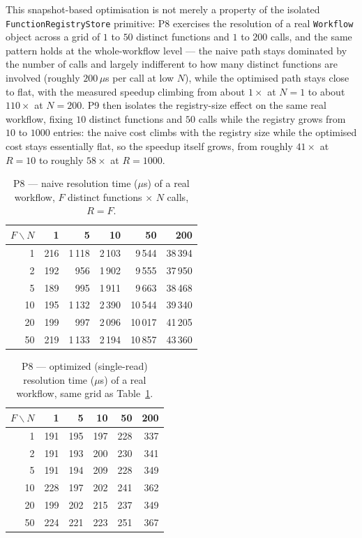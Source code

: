 This snapshot-based optimisation is not merely a property of the isolated
\texttt{FunctionRegistryStore} primitive: P8 exercises the resolution of a real \texttt{Workflow}
object across a grid of $1$ to $50$ distinct functions and $1$ to $200$ calls, and the same
pattern holds at the whole-workflow level --- the naive path stays dominated by the number of
calls and largely indifferent to how many distinct functions are involved (roughly $200\,\mu$s
per call at low $N$), while the optimised path stays close to flat, with the measured speedup
climbing from about $1\times$ at $N{=}1$ to about $110\times$ at $N{=}200$. P9 then isolates the
registry-size effect on the same real workflow, fixing $10$ distinct functions and $50$ calls
while the registry grows from $10$ to $1000$ entries: the naive cost climbs with the registry
size while the optimised cost stays essentially flat, so the speedup itself grows, from roughly
$41\times$ at $R{=}10$ to roughly $58\times$ at $R{=}1000$.

\begin{table}[htbp]
  \centering
  \caption{P8 --- naive resolution time (\(\mu\)s) of a real workflow, $F$ distinct functions
  $\times$ $N$ calls, $R{=}F$.}
  \label{tab:eval-p8-naive}
  \begin{tabular}{rrrrrr}
    \hline
    $F\backslash N$ & 1 & 5 & 10 & 50 & 200 \\
    \hline
    1  & 216 & 1\,118 & 2\,103 & 9\,544  & 38\,394 \\
    2  & 192 & 956    & 1\,902 & 9\,555  & 37\,950 \\
    5  & 189 & 995    & 1\,911 & 9\,663  & 38\,468 \\
    10 & 195 & 1\,132 & 2\,390 & 10\,544 & 39\,340 \\
    20 & 199 & 997    & 2\,096 & 10\,017 & 41\,205 \\
    50 & 219 & 1\,133 & 2\,194 & 10\,857 & 43\,360 \\
    \hline
  \end{tabular}
\end{table}

\begin{table}[htbp]
  \centering
  \caption{P8 --- optimized (single-read) resolution time (\(\mu\)s) of a real workflow, same
  grid as Table~\ref{tab:eval-p8-naive}.}
  \label{tab:eval-p8-optimized}
  \begin{tabular}{rrrrrr}
    \hline
    $F\backslash N$ & 1 & 5 & 10 & 50 & 200 \\
    \hline
    1  & 191 & 195 & 197 & 228 & 337 \\
    2  & 191 & 193 & 200 & 230 & 341 \\
    5  & 191 & 194 & 209 & 228 & 349 \\
    10 & 228 & 197 & 202 & 241 & 362 \\
    20 & 199 & 202 & 215 & 237 & 349 \\
    50 & 224 & 221 & 223 & 251 & 367 \\
    \hline
  \end{tabular}
\end{table}


